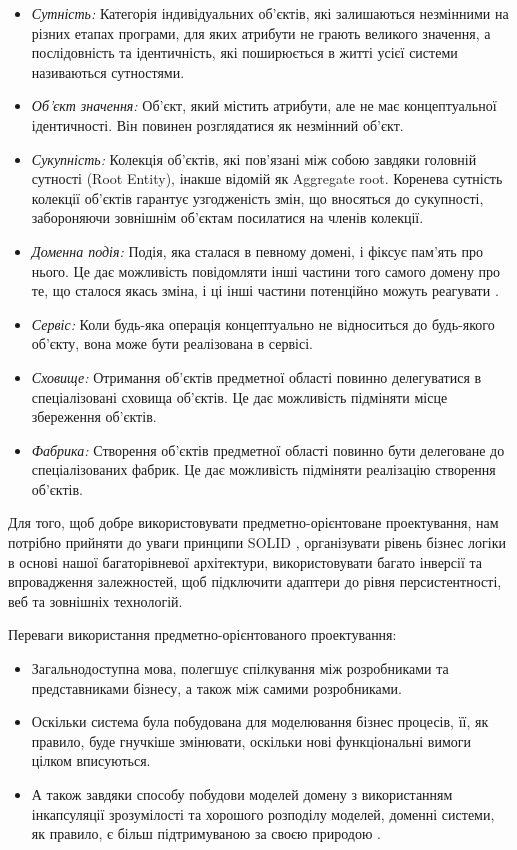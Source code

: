 \begin{itemize}
	\item \emph{Сутність:} Категорія індивідуальних об'єктів,
		які залишаються незмінними на різних етапах програми,
		для яких атрибути не грають великого значення, а послідовність та ідентичність,
		які поширюється в житті усієї системи називаються сутностями.
	\item \emph{Об'єкт значення:} Об'єкт, який містить атрибути,
		але не має концептуальної ідентичності. Він повинен розглядатися як незмінний об'єкт.
	\item \emph{Сукупність:} Колекція об'єктів, які пов'язані між собою завдяки
		головній сутності (Root Entity), інакше відомій як Aggregate root.
		Коренева сутність колекції об'єктів гарантує узгодженість змін,
		що вносяться до сукупності, забороняючи зовнішнім об'єктам посилатися на членів колекції.
	\item \emph{Доменна подія:} Подія, яка сталася в певному домені, і фіксує пам'ять про нього.
		Це дає можливість повідомляти інші частини того самого домену про те,
		що сталося якась зміна, і ці інші частини потенційно можуть реагувати \cite{de-article}.
	\item \emph{Сервіс:} Коли будь-яка операція концептуально не відноситься до будь-якого об'єкту,
		вона може бути реалізована в сервісі.
	\item \emph{Сховище:} Отримання об'єктів предметної області повинно делегуватися
		в спеціалізовані сховища об'єктів. Це дає можливість підміняти місце збереження об'єктів.
	\item \emph{Фабрика:} Створення об'єктів предметної області повинно бути делеговане до
		спеціалізованих фабрик. Це дає можливість підміняти реалізацію створення об'єктів.
\end{itemize}

Для того, щоб добре використовувати предметно-орієнтоване проектування,
нам потрібно прийняти до уваги принципи SOLID \cite{solid-martin},
організувати рівень бізнес логіки в основі нашої багаторівневої архітектури,
використовувати багато інверсії та впровадження залежностей,
щоб підключити адаптери до рівня персистентності, веб та зовнішніх технологій.

Переваги використання предметно-орієнтованого проектування:

\begin{itemize}
		\item Загальнодоступна мова, полегшує спілкування між
			розробниками та представниками бізнесу, а також між самими розробниками.
		\item Оскільки система була побудована для моделювання бізнес процесів,
			її, як правило, буде гнучкіше змінювати,
			оскільки нові функціональні вимоги цілком вписуються.
		\item А також завдяки способу побудови моделей домену з використанням
			інкапсуляції зрозумілості та хорошого розподілу моделей,
			доменні системи, як правило, є більш підтримуваною за своєю природою \cite{ddd-pros-cons}.
\end{itemize}

